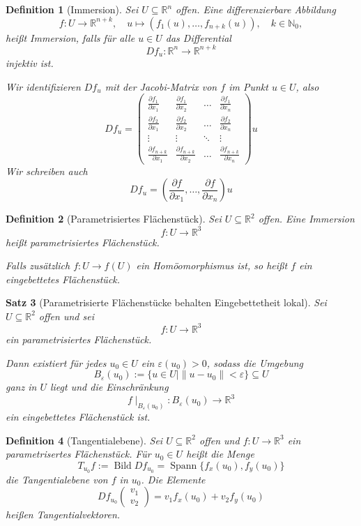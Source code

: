 \documentclass[a4paper,12pt]{article}
\theoremstyle{break}
\newtheorem{definition}{Definition}[section]
\newtheorem{theorem}[definition]{Satz}
\begin{document}
\begin{definition}[Immersion]
Sei \( U \subseteq \mathbb{R}^n \) offen. Eine differenzierbare Abbildung  
\[
f: U \to \mathbb{R}^{n+k}, \quad u \mapsto (f_1(u), \dots, f_{n+k}(u)), \quad k \in \mathbb{N}_0,
\]
heißt \emph{Immersion}, falls für alle \( u \in U \) das Differential  
\[
Df_u: \mathbb{R}^n \to \mathbb{R}^{n+k}
\]
injektiv ist.  

Wir identifizieren \( Df_u \) mit der Jacobi-Matrix von \( f \) im Punkt \( u \in U \), also  
\[
Df_u =
\begin{pmatrix}
\frac{\partial f_1}{\partial x_1} & \frac{\partial f_1}{\partial x_2} & \dots & \frac{\partial f_1}{\partial x_n} \\
\frac{\partial f_2}{\partial x_1} & \frac{\partial f_2}{\partial x_2} & \dots & \frac{\partial f_2}{\partial x_n} \\
\vdots & \vdots & \ddots & \vdots \\
\frac{\partial f_{n+k}}{\partial x_1} & \frac{\partial f_{n+k}}{\partial x_2} & \dots & \frac{\partial f_{n+k}}{\partial x_n}
\end{pmatrix}u
\]
Wir schreiben auch  
\[
Df_u = \left( \frac{\partial f}{\partial x_1}, \dots, \frac{\partial f}{\partial x_n} \right)u
\]
\end{definition}

\begin{definition}[Parametrisiertes Flächenstück]
Sei \( U \subseteq \mathbb{R}^2 \) offen.  
Eine Immersion  
\[
f: U \to \mathbb{R}^3
\]
heißt \emph{parametrisiertes Flächenstück}.  

Falls zusätzlich \( f: U \to f(U) \) ein Homöomorphismus ist, so heißt \( f \) ein \emph{eingebettetes Flächenstück}.
\end{definition}

\begin{theorem}[Parametrisierte Flächenstücke behalten Eingebettetheit lokal]
Sei \( U \subseteq \mathbb{R}^2 \) offen und sei  
\[
f: U \to \mathbb{R}^3
\]
ein parametrisiertes Flächenstück.  

Dann existiert für jedes \( u_0 \in U \) ein \( \varepsilon(u_0) > 0 \), sodass die Umgebung  
\[
B_{\varepsilon}(u_0) := \{ u \in U \mid \| u - u_0 \| < \varepsilon \} \subseteq U
\]
ganz in \( U \) liegt und die Einschränkung  
\[
f \mid_{B_{\varepsilon}(u_0)}: B_{\varepsilon}(u_0) \to \mathbb{R}^3
\]
ein eingebettetes Flächenstück ist.
\end{theorem}

\begin{definition}[Tangentialebene]
    Sei \( U \subseteq \mathbb{R}^2 \) offen und \( f: U \to \mathbb{R}^3 \) ein parametrisertes Flächenstück. 
    Für \( u_0 \in U \) heißt die Menge 
    \[
        T_{u_0} f := \operatorname{Bild} Df_{u_0} = \operatorname{Spann} \{ f_x(u_0), f_y(u_0) \}
    \]
    die \emph{Tangentialebene} von \( f \) in \( u_0 \).
    Die Elemente
    \[
        Df_{u_0} 
        \begin{pmatrix} v_1 \\ v_2 \end{pmatrix} 
        = v_1 f_x(u_0) + v_2 f_y(u_0)
    \]
    heißen \emph{Tangentialvektoren}.
\end{definition}
\end{document}
